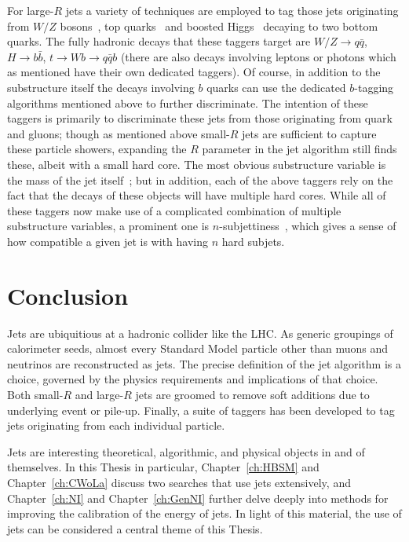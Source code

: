 For large-$R$ jets a variety of techniques are employed to tag those jets originating from $W/Z$ bosons~\cite{ATL-PHYS-PUB-2014-004,Aad:2015rpa,Aaboud:2018psm}, top quarks~\cite{Aad:2016pux,Aaboud:2018psm} and boosted Higgs~\cite{Aad:2019uoz} decaying to two bottom quarks.
The fully hadronic decays that these taggers target are $W/Z\rightarrow q\bar{q}$, $H\rightarrow b\bar{b}$, $t\rightarrow Wb \rightarrow q\bar{q} b$ (there are also decays involving leptons or photons which as mentioned have their own dedicated taggers).
Of course, in addition to the substructure itself the decays involving $b$ quarks can use the dedicated $b$-tagging algorithms mentioned above to further discriminate.
The intention of these taggers is primarily to discriminate these jets from those originating from quark and gluons; though as mentioned above small-$R$ jets are sufficient to capture these particle showers, expanding the $R$ parameter in the jet algorithm still finds these, albeit with a small hard core.
The most obvious substructure variable is the mass of the jet itself~\cite{ATLAS-CONF-2016-035}; but in addition, each of the above taggers rely on the fact that the decays of these objects will have multiple hard cores.
While all of these taggers now make use of a complicated combination of multiple substructure variables, a prominent one is $n$-subjettiness~\cite{Thaler:2010tr}, which gives a sense of how compatible a given jet is with having $n$ hard subjets.

\section{Conclusion}
\label{sec:jets:conclusion}
Jets are ubiquitious at a hadronic collider like the LHC.
As generic groupings of calorimeter seeds, almost every Standard Model particle other than muons and neutrinos are reconstructed as jets.
The precise definition of the jet algorithm is a choice, governed by the physics requirements and implications of that choice.
Both small-$R$ and large-$R$ jets are groomed to remove soft additions due to underlying event or pile-up.
Finally, a suite of taggers has been developed to tag jets originating from each individual particle.

Jets are interesting theoretical, algorithmic, and physical objects in and of themselves.
In this Thesis in particular, Chapter~\ref{ch:HBSM} and Chapter~\ref{ch:CWoLa} discuss two searches that use jets extensively, and Chapter~\ref{ch:NI} and Chapter~\ref{ch:GenNI} further delve deeply into methods for improving the calibration of the energy of jets.
In light of this material, the use of jets can be considered a central theme of this Thesis.
